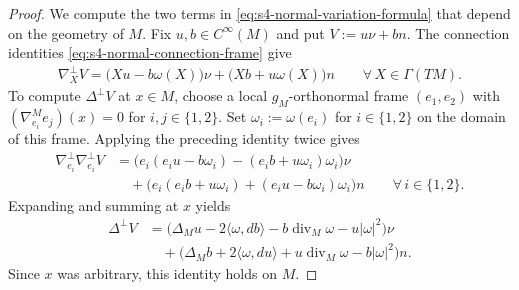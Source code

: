 \documentclass[a4paper,11pt,oneside,reqno]{amsart}
\numberwithin{equation}{section}
\theoremstyle{definition}
\begin{document}
\begin{proof}
    We compute the two terms in
    \eqref{eq:s4-normal-variation-formula} that depend
    on the geometry of $M$. Fix $u,b\in C^\infty(M)$
    and put $V:=u\nu+bn$. The connection identities
    \eqref{eq:s4-normal-connection-frame} give
    \begin{align*}
        \nabla^\perp_XV
        =\bigl(Xu-b\omega(X)\bigr)\nu
        +\bigl(Xb+u\omega(X)\bigr)n
        \qquad\forall\,X\in\Gamma(TM).
    \end{align*}
    To compute $\Delta^\perp V$ at $x\in M$, choose
    a local $g_M$-orthonormal frame $(e_1,e_2)$ with
    $(\nabla^M_{e_i}e_j)(x)=0$ for
    $i,j\in\{1,2\}$. Set $\omega_i:=\omega(e_i)$
    for $i\in\{1,2\}$ on the domain of this frame.
    Applying the preceding identity twice gives
    \begin{align*}
        \nabla^\perp_{e_i}\nabla^\perp_{e_i}V
        &={}
        \bigl(e_i(e_iu-b\omega_i)
        -(e_ib+u\omega_i)\omega_i\bigr)\nu\\
        &\quad+
        \bigl(e_i(e_ib+u\omega_i)
        +(e_iu-b\omega_i)\omega_i\bigr)n
        \qquad\forall\,i\in\{1,2\}.
    \end{align*}
    Expanding and summing at $x$ yields
    \begin{align*}
        \Delta^\perp V
        &={}
        \bigl(\Delta_Mu-2\langle\omega,db\rangle
        -b\operatorname{div}_M\omega
        -u|\omega|^2\bigr)\nu\\
        &\quad+
        \bigl(\Delta_Mb+2\langle\omega,du\rangle
        +u\operatorname{div}_M\omega
        -b|\omega|^2\bigr)n.
    \end{align*}
    Since $x$ was arbitrary, this identity holds on $M$.


\end{proof}
\end{document}
